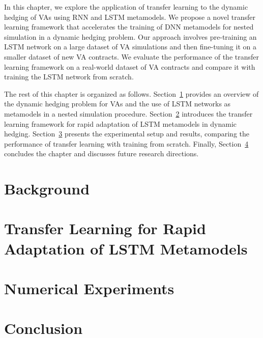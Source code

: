 In this chapter, we explore the application of transfer learning to the dynamic hedging of VAs using RNN and LSTM metamodels.
We propose a novel transfer learning framework that accelerates the training of DNN metamodels for nested simulation in a dynamic hedging problem.
Our approach involves pre-training an LSTM network on a large dataset of VA simulations and then fine-tuning it on a smaller dataset of new VA contracts.
We evaluate the performance of the transfer learning framework on a real-world dataset of VA contracts and compare it with training the LSTM network from scratch.

The rest of this chapter is organized as follows.
Section~\ref{sec3:background} provides an overview of the dynamic hedging problem for VAs and the use of LSTM networks as metamodels in a nested simulation procedure.
Section~\ref{sec3:transfer_learning} introduces the transfer learning framework for rapid adaptation of LSTM metamodels in dynamic hedging.
Section~\ref{sec3:experiments} presents the experimental setup and results, comparing the performance of transfer learning with training from scratch.
Finally, Section~\ref{sec3:conclusion} concludes the chapter and discusses future research directions.

\section{Background} \label{sec3:background}

\section{Transfer Learning for Rapid Adaptation of LSTM Metamodels} \label{sec3:transfer_learning}



\section{Numerical Experiments} \label{sec3:experiments}

\section{Conclusion} \label{sec3:conclusion}

